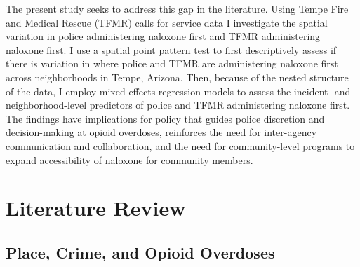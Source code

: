 The present study seeks to address this gap in the literature. Using Tempe Fire and Medical Rescue (TFMR) calls for service data I investigate the spatial variation in police administering naloxone first and TFMR administering naloxone first. I use a spatial point pattern test to first descriptively assess if there is variation in where police and TFMR are administering naloxone first across neighborhoods in Tempe, Arizona. Then, because of the nested structure of the data, I employ mixed-effects regression models to assess the incident- and neighborhood-level predictors of police and TFMR administering naloxone first. The findings have implications for policy that guides police discretion and decision-making at opioid overdoses, reinforces the need for inter-agency communication and collaboration, and the need for community-level programs to expand accessibility of naloxone for community members.

\section{\centering Literature Review}

\subsection{Place, Crime, and Opioid Overdoses}

